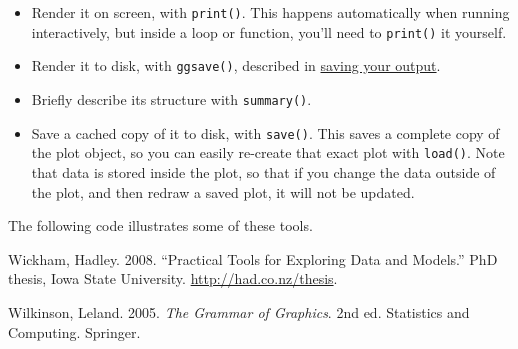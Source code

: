 \begin{itemize}
\item
  Render it on screen, with \texttt{print()}. This happens automatically
  when running interactively, but inside a loop or function, you'll need
  to \texttt{print()} it yourself. 
\item
  Render it to disk, with \texttt{ggsave()}, described in
  \hyperref[sec:saving]{saving your output}.
\item
  Briefly describe its structure with \texttt{summary()}.
\item
  Save a cached copy of it to disk, with \texttt{save()}. This saves a
  complete copy of the plot object, so you can easily re-create that
  exact plot with \texttt{load()}. Note that data is stored inside the
  plot, so that if you change the data outside of the plot, and then
  redraw a saved plot, it will not be updated. 
\end{itemize}

The following code illustrates some of these tools.

\begin{Shaded}
\begin{Highlighting}[]
\StringTok{ }  
\CommentTok{#> -----------------------------------}
\end{Highlighting}
\end{Shaded}

\begin{Shaded}
\begin{Highlighting}[]
 \NormalTok{)}
\NormalTok{(}\NormalTok{)}
\NormalTok{(}\NormalTok{, } \NormalTok{, } \NormalTok{)}
\end{Highlighting}
\end{Shaded}

Wickham, Hadley. 2008. ``Practical Tools for Exploring Data and
Models.'' PhD thesis, Iowa State University.
\url{http://had.co.nz/thesis}.

Wilkinson, Leland. 2005. \emph{The Grammar of Graphics}. 2nd ed.
Statistics and Computing. Springer.

